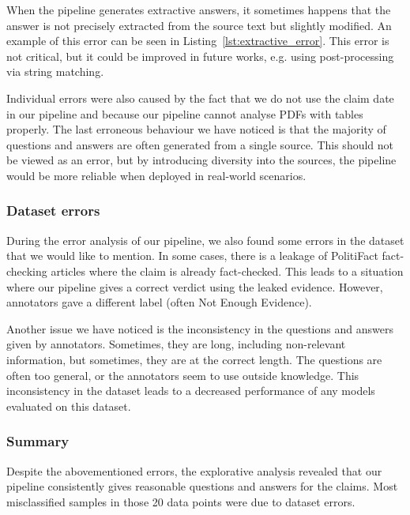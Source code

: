 When the pipeline generates extractive answers, it sometimes happens that the answer is not precisely extracted from the source text but slightly modified. An example of this error can be seen in Listing~\ref{lst:extractive_error}. This error is not critical, but it could be improved in future works, e.g. using post-processing via string matching.

Individual errors were also caused by the fact that we do not use the claim date in our pipeline and because our pipeline cannot analyse PDFs with tables properly. The last erroneous behaviour we have noticed is that the majority of questions and answers are often generated from a single source. This should not be viewed as an error, but by introducing diversity into the sources, the pipeline would be more reliable when deployed in real-world scenarios.

\subsubsection{Dataset errors}
During the error analysis of our pipeline, we also found some errors in the \averitec{} dataset that we would like to mention. In some cases, there is a leakage of PolitiFact fact-checking articles where the claim is already fact-checked. This leads to a situation where our pipeline gives a correct verdict using the leaked evidence. However, annotators gave a different label (often Not Enough Evidence). 

Another issue we have noticed is the inconsistency in the questions and answers given by annotators. Sometimes, they are long, including non-relevant information, but sometimes, they are at the correct length. The questions are often too general, or the annotators seem to use outside knowledge. This inconsistency in the dataset leads to a decreased performance of any models evaluated on this dataset.

\subsubsection{Summary}
Despite the abovementioned errors, the explorative analysis revealed that our pipeline consistently gives reasonable questions and answers for the claims. Most misclassified samples in those 20 data points were due to dataset errors.

